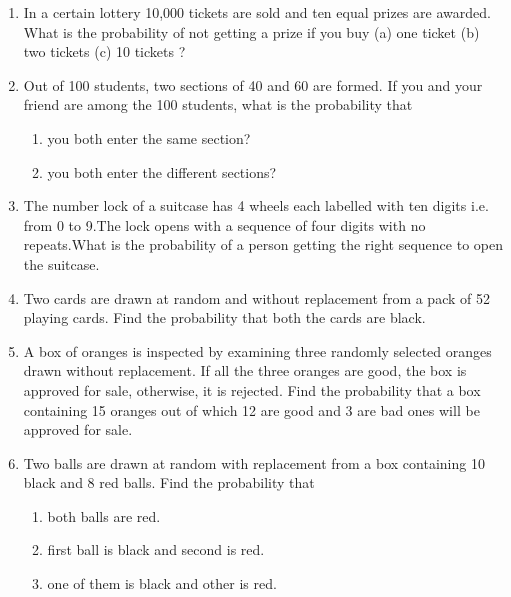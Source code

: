 \begin{enumerate}[label=\thesection.\arabic*,ref=\thesection.\theenumi]
\solution
		
\item In a certain lottery 10,000 tickets are sold and ten equal prizes are awarded. What is the probability of not getting a prize if you buy (a) one ticket (b) two tickets (c) 10 tickets ?	
\\
\solution
		
\item 
Out of 100 students, two sections of 40 and 60 are formed. If you and your friend are among the 100 students, what is the probability that
\begin{enumerate}
\item you both enter the same section?
\item you both enter the different sections?
\end{enumerate}
\solution
		
	\item 
The number lock of a suitcase has 4 wheels each labelled with ten digits i.e. from 0 to 9.The lock opens with a sequence of four digits with no repeats.What is the probability of a person getting the right sequence to open the suitcase.
\\
\solution
		
\item 
Two cards are drawn at random and without replacement from a pack of 52 playing cards. Find the probability that both the cards are black.
\\
\solution
		
		\item A box of oranges is inspected by examining three randomly selected oranges drawn without replacement. If all the three oranges are good, the box is approved for sale, otherwise, it is rejected. Find the probability that a box containing 15 oranges out of which 12 are good and 3 are bad ones will be approved for sale.
		\label{ncert/12/13/2/3/defs.tex}
		\item Two balls are drawn at random with replacement from a box containing 10 black and 8 red balls. Find the probability that
		\label{ncert/12/13/2/12}
\begin{enumerate}
\item both balls are red.
\item first ball is black and second is red.
\item one of them is black and other is red.
\end{enumerate}


\end{enumerate}
